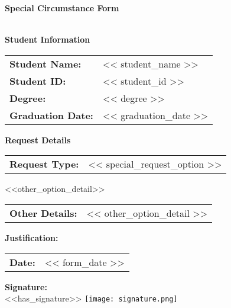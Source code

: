\documentclass[12pt]{article}
\begin{document}
\begin{center}
    \LARGE\textbf{Special Circumstance Form}\\[0.5cm]
    
    \\[1cm]
\end{center}

\noindent\textbf{Student Information}\\[0.3cm]
\noindent\begin{tabular}{@{}p{4cm}p{12cm}@{}}
\textbf{Student Name:} & << student_name >> \\[0.3cm]
\textbf{Student ID:} & << student_id >> \\[0.3cm]
\textbf{Degree:} & << degree >> \\[0.3cm]
\textbf{Graduation Date:} & << graduation_date >> \\[0.3cm]
\end{tabular}

\vspace{1cm}
\noindent\textbf{Request Details}\\[0.3cm]
\noindent\begin{tabular}{@{}p{4cm}p{12cm}@{}}
\textbf{Request Type:} & << special_request_option >> \\[0.3cm]
\end{tabular}

\ifx\relax<<other_option_detail>>\relax
\else
\noindent\begin{tabular}{@{}p{4cm}p{12cm}@{}}
\textbf{Other Details:} & << other_option_detail >> \\[0.3cm]
\end{tabular}
\fi

\vspace{0.5cm}
\noindent\textbf{Justification:}\\[0.3cm]

\vspace{1cm}
\noindent\begin{tabular}{@{}p{4cm}p{12cm}@{}}
\textbf{Date:} & << form_date >> \\[0.3cm]
\end{tabular}

\vspace{1cm}
\noindent\textbf{Signature:}\\[0.3cm]
\ifx\relax<<has_signature>>\relax
    \fbox{\parbox{8cm}{\vspace{2cm}\hspace{7cm}}}
\else
    \texttt{[image: signature.png]}
\fi

\vspace{2cm}
\end{document}
